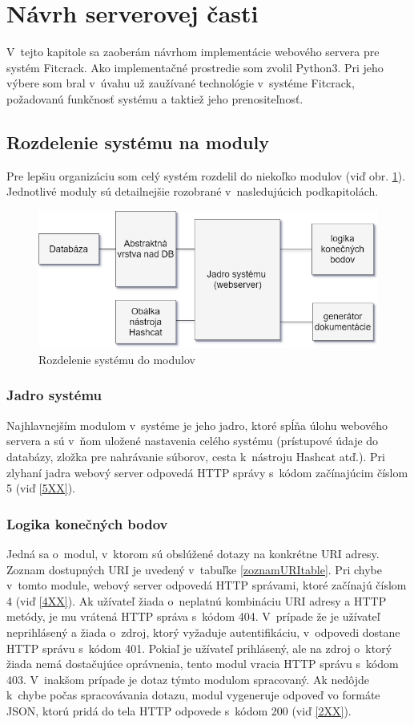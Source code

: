\documentclass[../projekt.tex]{subfiles}
\begin{document}
\section{Návrh serverovej časti}\label{navrhServer}
V~tejto kapitole sa zaoberám návrhom implementácie webového servera pre systém Fitcrack. Ako implementačné prostredie som zvolil Python3. Pri jeho výbere som bral v~úvahu už zaužívané technológie v~systéme Fitcrack, požadovanú funkčnosť systému a taktiež jeho prenositeľnosť.

\subsection{Rozdelenie systému na moduly}
Pre lepšiu organizáciu som celý systém rozdelil do niekoľko modulov (viď obr. \ref{fig:moduly}). Jednotlivé moduly sú detailnejšie rozobrané v~nasledujúcich podkapitolách. 

\begin{figure}[h]
    \label{fig:moduly}
    \centering
    \includegraphics[scale=0.6]{obrazky/moduly.png}
    \caption{Rozdelenie systému do modulov}
\end{figure}

\subsubsection{Jadro systému}
Najhlavnejším modulom v~systéme je jeho jadro, ktoré spĺňa úlohu webového servera a sú v~ňom uložené nastavenia celého systému (prístupové údaje do databázy, zložka pre nahrávanie súborov, cesta k~nástroju Hashcat atď.). Pri zlyhaní jadra webový server odpovedá HTTP správy s~kódom začínajúcim číslom 5 (viď \ref{5XX}).


\subsubsection{Logika konečných bodov}
Jedná sa o~modul, v~ktorom sú obslúžené dotazy na konkrétne URI adresy. Zoznam dostupných URI je uvedený v~tabuľke \ref{zoznamURItable}. Pri chybe v~tomto module, webový server odpovedá HTTP správami, ktoré začínajú číslom 4 (viď \ref{4XX}). Ak užívateľ žiada o~neplatnú kombináciu URI adresy a HTTP metódy, je mu vrátená HTTP správa s~kódom 404. V~prípade že je užívateľ neprihlásený a žiada o~zdroj, ktorý vyžaduje autentifikáciu, v~odpovedi dostane HTTP správu s~kódom 401. Pokiaľ je užívateľ prihlásený, ale na zdroj o~ktorý žiada nemá dostačujúce oprávnenia, tento modul vracia HTTP správu s~kódom 403. V~inakšom prípade je dotaz týmto modulom spracovaný. Ak nedôjde k~chybe počas spracovávania dotazu, modul vygeneruje odpoveď vo formáte JSON, ktorú pridá do tela HTTP odpovede s~kódom 200 (viď \ref{2XX}).
\end{document}
